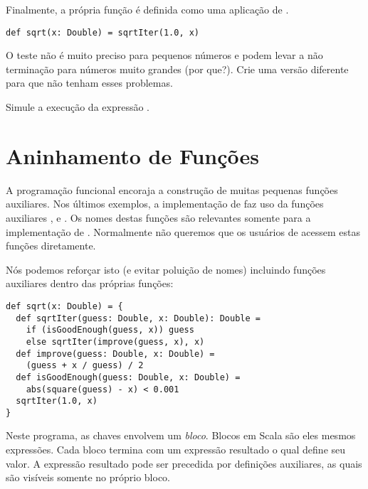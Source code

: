 Finalmente, a pr\'{o}pria fun\c{c}\~{a}o  \'{e} definida como uma aplica\c{c}\~{a}o de
.
  
\begin{lstlisting}
def sqrt(x: Double) = sqrtIter(1.0, x)
\end{lstlisting}

\begin{exercise} O teste  n\~{a}o \'{e} muito preciso para pequenos 
n\'{u}meros e podem levar a n\~{a}o termina\c{c}\~{a}o para n\'{u}meros muito grandes (por que?).
Crie uma vers\~{a}o diferente para  que n\~{a}o tenham esses problemas.
\end{exercise}

\begin{exercise} Simule a execu\c{c}\~{a}o da express\~{a}o .
\end{exercise}

\section{Aninhamento de Fun\c{c}\~{o}es}

A programa\c{c}\~{a}o funcional encoraja a constru\c{c}\~{a}o de muitas pequenas fun\c{c}\~{o}es
auxiliares. Nos \'{u}ltimos exemplos, a implementa\c{c}\~{a}o de  faz uso da
fun\c{c}\~{o}es auxiliares ,  e .
Os nomes destas fun\c{c}\~{o}es s\~{a}o relevantes somente para a implementa\c{c}\~{a}o de 
. Normalmente n\~{a}o queremos que os usu\'{a}rios de  acessem
estas fun\c{c}\~{o}es diretamente.  

N\'{o}s podemos refor\c{c}ar isto (e evitar polui\c{c}\~{a}o de nomes) incluindo
fun\c{c}\~{o}es auxiliares dentro das pr\'{o}prias fun\c{c}\~{o}es: 
\begin{lstlisting}
def sqrt(x: Double) = {
  def sqrtIter(guess: Double, x: Double): Double =
    if (isGoodEnough(guess, x)) guess
    else sqrtIter(improve(guess, x), x)
  def improve(guess: Double, x: Double) =
    (guess + x / guess) / 2
  def isGoodEnough(guess: Double, x: Double) =
    abs(square(guess) - x) < 0.001
  sqrtIter(1.0, x)
}
\end{lstlisting}

Neste programa, as chaves  envolvem um {\em bloco}. 
Blocos em Scala s\~{a}o eles mesmos express\~{o}es. Cada bloco termina com um
express\~{a}o resultado o qual define seu valor. A express\~{a}o  resultado pode 
ser precedida por defini\c{c}\~{o}es auxiliares, as quais s\~{a}o vis\'{i}veis somente no
pr\'{o}prio bloco. 

